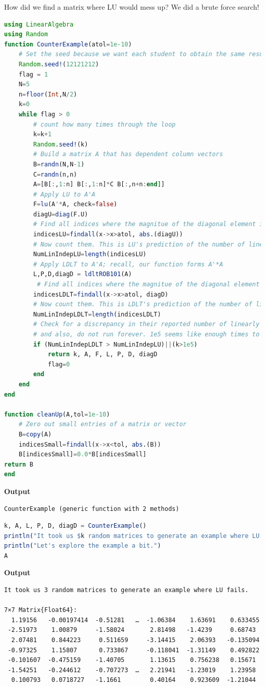 How did we find a matrix where LU would mess up? We did a brute force search! 

\begin{lstlisting}[language=Julia,style=mystyle]
using LinearAlgebra
using Random
function CounterExample(atol=1e-10)
    # Set the seed because we want each student to obtain the same results
    Random.seed!(12121212)
    flag = 1
    N=5
    n=floor(Int,N/2)
    k=0
    while flag > 0
        # count how many times through the loop
        k=k+1
        Random.seed!(k)
        # Build a matrix A that has dependent column vectors
        B=randn(N,N-1)
        C=randn(n,n)
        A=[B[:,1:n] B[:,1:n]*C B[:,n+n:end]]
        # Apply LU to A'A
        F=lu(A'*A, check=false)
        diagU=diag(F.U)
        # Find all indices where the magnitue of the diagonal element is not too small
        indicesLU=findall(x->x>atol, abs.(diagU))
        # Now count them. This is LU's prediction of the number of linearly independent vectors
        NumLinIndepLU=length(indicesLU)
        # Apply LDLT to A'A; recall, our function forms A'*A
        L,P,D,diagD = ldltROB101(A)
         # Find all indices where the magnitue of the diagonal element is not too small
        indicesLDLT=findall(x->x>atol, diagD)
        # Now count them. This is LDLT's prediction of the number of linearly independent vectors
        NumLinIndepLDLT=length(indicesLDLT)
        # Check for a discrepancy in their reported number of linearly indep columns
        # and also, do not run forever. 1e5 seems like enough times to loop through random matrices
        if (NumLinIndepLDLT > NumLinIndepLU)||(k>1e5)
            return k, A, F, L, P, D, diagD
            flag=0
        end        
    end
end

function cleanUp(A,tol=1e-10)
    # Zero out small entries of a matrix or vector
    B=copy(A)
    indicesSmall=findall(x->x<tol, abs.(B))
    B[indicesSmall]=0.0*B[indicesSmall]
return B
end
\end{lstlisting}
\textbf{Output} 
\begin{verbatim}
CounterExample (generic function with 2 methods)
\end{verbatim}

\begin{lstlisting}[language=Julia,style=mystyle]
k, A, L, P, D, diagD = CounterExample()
println("It took us $k random matrices to generate an example where LU fails.")
println("Let's explore the example a bit.")
A
\end{lstlisting}
\textbf{Output} 
\begin{verbatim}
It took us 3 random matrices to generate an example where LU fails.

7×7 Matrix{Float64}:
  1.19156   -0.00197414  -0.51281   …  -1.06384    1.63691    0.633455
 -2.51973    1.00879     -1.58024       2.81498   -1.4239     0.68743
  2.07481    0.844223     0.511659     -3.14415    2.06393   -0.135094
 -0.97325    1.15807      0.733867     -0.118041  -1.31149    0.492822
 -0.101607  -0.475159    -1.40705       1.13615    0.756238   0.15671
 -1.54251   -0.244612    -0.707273  …   2.21941   -1.23019    1.23958
  0.100793   0.0718727   -1.1661        0.40164    0.923609  -1.21044
\end{verbatim}

